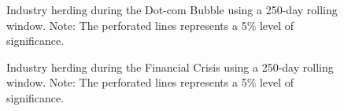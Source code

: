 \documentclass[
  letterpaper,
  DIV=11,
  numbers=noendperiod]{scrartcl}
\begin{document}
\begin{figure}[H]


\caption{\label{fig-rol_crisis_db}Industry herding during the Dot-com
Bubble using a 250-day rolling window. Note: The perforated lines
represents a 5\% level of significance.}

\end{figure}%

\begin{figure}[H]


\caption{\label{fig-rol_crisis_fc}Industry herding during the Financial
Crisis using a 250-day rolling window. Note: The perforated lines
represents a 5\% level of significance.}

\end{figure}%
\end{document}
